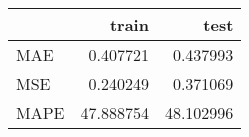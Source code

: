 \begin{tabular}{lrr}
\toprule
{} &      train &       test \\
\midrule
MAE  &   0.407721 &   0.437993 \\
MSE  &   0.240249 &   0.371069 \\
MAPE &  47.888754 &  48.102996 \\
\bottomrule
\end{tabular}
